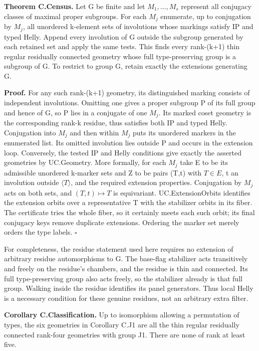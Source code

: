 \textbf{Theorem C.Census.} Let G be finite and let \(M_{1},\ldots ,M_s\)
represent all conjugacy classes of maximal proper subgroups. For each
\(M_j\) enumerate, up to conjugation by \(M_j\), all unordered k-element
sets of involutions whose markings satisfy IP and typed Helly. Append
every involution of G outside the subgroup generated by each retained
set and apply the same tests. This finds every rank-(k+1) thin regular
residually connected geometry whose full type-preserving group is a
subgroup of G. To restrict to group G, retain exactly the extensions
generating G.

\textbf{Proof.} For any such rank-(k+1) geometry, its distinguished
marking consists of independent involutions. Omitting one gives a proper
subgroup P of its full group and hence of G, so P lies in a conjugate of
one \(M_j\). Its marked coset geometry is the corresponding rank-k
residue, thus satisfies both IP and typed Helly. Conjugation into
\(M_j\) and then within \(M_j\) puts its unordered markers in the
enumerated list. Its omitted involution lies outside P and occurs in the
extension loop. Conversely, the tested IP and Helly conditions give
exactly the asserted geometries by UC.Geometry. More formally, for each
\(M_j\) take E to be its admissible unordered k-marker sets and Z to be
pairs (T,t) with \(T\in E\), t an involution outside
\(\langle T\rangle\), and the required extension properties. Conjugation
by \(M_j\) acts on both sets, and \((T,t)\mapsto T\) is equivariant.
UC.ExtensionOrbits identifies the extension orbits over a representative
T with the stabilizer orbits in its fiber. The certificate tries the
whole fiber, so it certainly meets each such orbit; its final conjugacy
keys remove duplicate extensions. Ordering the marker set merely orders
the type labels. \(\square\)

For completeness, the residue statement used here requires no extension
of arbitrary residue automorphisms to G. The base-flag stabilizer acts
transitively and freely on the residue's chambers, and the residue is
thin and connected. Its full type-preserving group also acts freely, so
the stabilizer already is that full group. Walking inside the residue
identifies its panel generators. Thus local Helly is a necessary
condition for these genuine residues, not an arbitrary extra filter.

\textbf{Corollary C.Classification.} Up to isomorphism allowing a
permutation of types, the six geometries in Corollary C.J1 are all the
thin regular residually connected rank-four geometries with group J1.
There are none of rank at least five.

